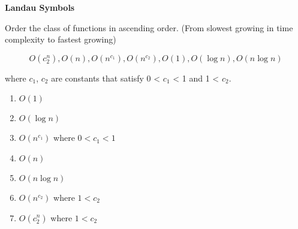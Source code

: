\question \textbf{Landau Symbols}

Order the class of functions in ascending order. (From slowest growing in time complexity
to fastest growing)

\[O(c_2^n), O(n), O(n^{c_1}), O(n^{c_2}), O(1), O(\log n), O(n \log n)\]

where \(c_1\), \(c_2\) are constants that satisfy 0 < \(c_1\) < 1 and 1 < \(c_2\).

\begin{solution}
\begin{enumerate}
\item \(O(1)\)
\item \(O(\log n)\)
\item \(O(n^{c_1})\) where \(0 < c_1 < 1\)
\item \(O(n)\)
\item \(O(n \log n)\)
\item \(O(n^{c_2})\) where \(1 < c_2\)
\item \(O(c_2^n)\) where \(1 < c_2\)
\end{enumerate}
\end{solution}
